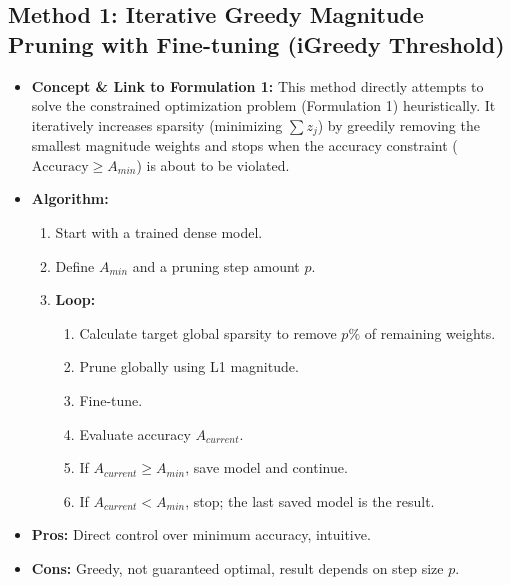 \documentclass[conference]{IEEEtran} %
\begin{document}
\subsection{Method 1: Iterative Greedy Magnitude Pruning with Fine-tuning (iGreedy Threshold)}
\begin{itemize}
    \item \textbf{Concept \& Link to Formulation 1:} This method directly attempts to solve the constrained optimization problem (Formulation 1) heuristically. It iteratively increases sparsity (minimizing $\sum z_j$) by greedily removing the smallest magnitude weights and stops when the accuracy constraint ($\text{Accuracy} \ge A_{min}$) is about to be violated.
    \item \textbf{Algorithm:}
    \begin{enumerate} %
        \item Start with a trained dense model.
        \item Define $A_{min}$ and a pruning step amount $p$.
        \item \textbf{Loop:}
        \begin{enumerate} %
            \item Calculate target global sparsity to remove $p\%$ of remaining weights.
            \item Prune globally using L1 magnitude.
            \item Fine-tune.
            \item Evaluate accuracy $A_{current}$.
            \item If $A_{current} \ge A_{min}$, save model and continue.
            \item If $A_{current} < A_{min}$, stop; the last saved model is the result.
        \end{enumerate} %
    \end{enumerate} %
    \item \textbf{Pros:} Direct control over minimum accuracy, intuitive.
    \item \textbf{Cons:} Greedy, not guaranteed optimal, result depends on step size $p$.
\end{itemize}
\end{document}

